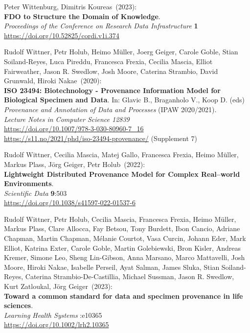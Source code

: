 \begin{thebibliography}{9}
Peter Wittenburg, Dimitris Koureas~(2023): \\
\textbf{FDO to Structure the Domain of Knowledge}.\\
\emph{Proceedings of the Conference on Research Data Infrastructure}
\textbf{1} \\
\url{https://doi.org/10.52825/cordi.v1i.374}

Rudolf Wittner, Petr Holub, Heimo Müller, Joerg Geiger, Carole Goble, Stian Soiland-Reyes, Luca Pireddu, Francesca Frexia, Cecilia Mascia, Elliot Fairweather, Jason R. Swedlow, Josh Moore, Caterina Strambio, David Grunwald, Hiroki Nakae~(2020): \\
\textbf{ISO 23494: Biotechnology - Provenance Information Model for Biological Specimen and Data}.
In: Glavic B., Braganholo V., Koop D. (eds) 
\emph{Provenance and Annotation of Data and Processes} (IPAW 2020/2021).\\
\emph{Lecture Notes in Computer Science 12839}\\
\url{https://doi.org/10.1007/978-3-030-80960-7_16} \\
\url{https://s11.no/2021/phd/iso-23494-provenance/}
(Supplement 7)

Rudolf Wittner, Cecilia Mascia, Matej Gallo, Francesca Frexia, Heimo Müller, Markus Plass, Jörg Geiger, Petr Holub~(2022): \\
\textbf{Lightweight Distributed Provenance Model for Complex Real--world Environments}.\\
\emph{Scientific Data} \textbf{9}:503 \\
\url{https://doi.org/10.1038/s41597-022-01537-6}

Rudolf Wittner, Petr Holub, Cecilia Mascia, Francesca Frexia, Heimo Müller, Markus Plass, Clare Allocca, Fay Betsou, Tony Burdett, Ibon Cancio, Adriane Chapman, Martin Chapman, Mélanie Courtot, Vasa Curcin, Johann Eder, Mark Elliot, Katrina Exter, Carole Goble, Martin Golebiewski, Bron Kisler, Andreas Kremer, Simone Leo, Sheng Lin-Gibson, Anna Marsano, Marco Mattavelli, Josh Moore, Hiroki Nakae, Isabelle Perseil, Ayat Salman, James Sluka, Stian Soiland-Reyes, Caterina Strambio-De-Castillia, Michael Sussman, Jason R. Swedlow, Kurt Zatloukal, Jörg Geiger~(2023): \\
\textbf{Toward a common standard for data and specimen provenance in life sciences}.\\
\emph{Learning Health Systems} :e10365 \\
\url{https://doi.org/10.1002/lrh2.10365}


\end{thebibliography}
